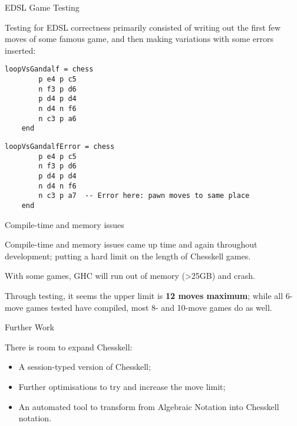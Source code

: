 \documentclass{beamer}
\begin{document}
\begin{frame}[fragile]{EDSL Game Testing}
    
Testing for EDSL correctness primarily consisted of writing out the first few moves of some famous game, and then making variations with some errors inserted:

\begin{overprint}

\begin{lstlisting}
loopVsGandalf = chess
        p e4 p c5
        n f3 p d6
        p d4 p d4
        n d4 n f6
        n c3 p a6
    end
\end{lstlisting}

\begin{lstlisting}
loopVsGandalfError = chess
        p e4 p c5
        n f3 p d6
        p d4 p d4
        n d4 n f6
        n c3 p a7  -- Error here: pawn moves to same place
    end
\end{lstlisting}

\end{overprint}

\end{frame}

\begin{frame}{Compile-time and memory issues}

Compile-time and memory issues came up time and again throughout development; putting a hard limit on the length of Chesskell games.

With some games, GHC will run out of memory (\textgreater 25GB) and crash.

Through testing, it seems the upper limit is \textbf{12 moves maximum}; while all 6-move games tested have compiled, most 8- and 10-move games do as well.
    
\end{frame}

\begin{frame}{Further Work}

There is room to expand Chesskell:

\pause

\begin{itemize}
    \item<2-> A session-typed version of Chesskell;
    \item<3-> Further optimisations to try and increase the move limit;
    \item<4-> An automated tool to transform from Algebraic Notation into Chesskell notation.
\end{itemize}
    
\end{frame}
\end{document}
